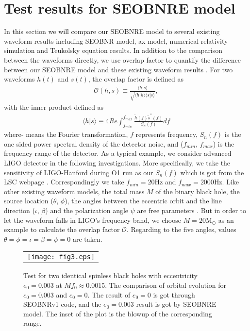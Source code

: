 \documentclass[prd,aps,a4paper,superscriptaddress,twocolumn,footinbib,showpacs]{revtex4}
\begin{document}
\section{Test results for SEOBNRE model}\label{sec::tests}
In this section we will compare our SEOBNRE model to several existing waveform results including SEOBNR model, ax model, numerical relativity simulation and Teukolsky equation results. In addition to the comparison between the waveforms directly, we use overlap factor to quantify the difference between our SEOBNRE model and these existing waveform results \cite{PhysRevD.90.062003}. For two waveforms $h(t)$ and $s(t)$, the overlap factor is defined as
\begin{align}
\mathcal{O}(h,s)\equiv\frac{\langle h|s\rangle}{\sqrt{\langle h|h\rangle\langle s|s\rangle}},\label{overlapfactordef}
\end{align}
with the inner product defined as
\begin{align}
\langle h|s\rangle\equiv4Re\int_{f_{min}}^{f_{max}}\frac{\tilde{h}(f)\tilde{s}^*(f)}{S_n(f)}df
\end{align}
where $\tilde{}$ means the Fourier transformation, $f$ represents frequency, $S_n(f)$ is the one sided power spectral density of the detector noise, and ($f_{min}$, $f_{max}$) is the frequency range of the detector. As a typical example, we consider advanced LIGO detector in the following investigations. More specifically, we take the sensitivity of LIGO-Hanford during O1 run as our $S_n(f)$ which is got from the LSC webpage \cite{LSC150914}. Correspondingly we take $f_{min}=20$Hz and $f_{max}=2000$Hz. Like other existing waveform models, the total mass $M$ of the binary black hole, the source location ($\theta$, $\phi$), the angles between the eccentric orbit and the line direction ($\iota$, $\beta$) and the polarization angle $\psi$ are free parameters \cite{PhysRevD.92.044034}. But in order to let the waveform falls in LIGO's frequency band, we choose $M=20$M$_\odot$ as an example to calculate the overlap factor $\mathcal{O}$. Regarding to the five angles, values $\theta=\phi=\iota=\beta=\psi=0$ are taken.
\begin{figure}
\begin{tabular}{c}
\texttt{[image: fig3.eps]}
\end{tabular}
\caption{Test for two identical spinless black holes with eccentricity $e_0=0.003$ at $Mf_0\approx0.0015$. The comparison of orbital evolution for $e_0=0.003$ and $e_0=0$. The result of $e_0=0$ is got through SEOBNRv1 code, and the $e_0=0.003$ result is got by SEOBNRE model. The inset of the plot is the blowup of the corresponding range.}\label{fig3}
\end{figure}
\end{document}
